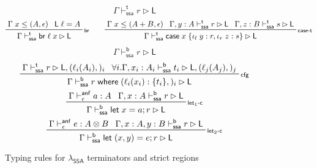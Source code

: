 \documentclass[acmsmall,screen,review]{acmart}
\newcommand{\ms}[1]{\ensuremath{\mathsf{#1}}}
\newcommand{\lto}{:}
\newcommand{\linl}[1]{\iota_l\;{#1}}
\newcommand{\linr}[1]{\iota_r\;{#1}}
\newcommand{\letstmt}[3]{\ensuremath{\ms{let}\;#1 = #2; #3}}
\newcommand{\brb}[2]{\ms{br}\;#1\;#2}
\newcommand{\casestmt}[5]{\ms{case}\;#1\;\{\linl{#2} \lto #3, \linr{#4} \lto #5\}}
\newcommand{\where}[2]{#1\;\ms{where}\;#2}
\newcommand{\wbranch}[3]{#1(#2) \lto \{#3\}}
\newcommand{\bhyp}[2]{#1 : #2}
\newcommand{\lhyp}[2]{#1(#2)}
\newcommand{\rle}[1]{{\scriptsize\textsf{#1}}}
\newcommand{\ahasty}[4]{#1 \vdash_{#2}^{\ms{anf}} #3 : {#4}}
\newcommand{\thaslb}[3]{#1 \vdash^{\ms{t}}_{\ms{ssa}} #2 \rhd #3}
\newcommand{\bhaslb}[3]{#1 \vdash^{\ms{b}}_{\ms{ssa}} #2 \rhd #3}
\newcommand{\isotopessa}{\(\lambda_{\ms{SSA}}\)}
\begin{document}
\begin{figure}
  \begin{equation*}
    \boxed{\thaslb{\Gamma}{r}{\ms{L}}}
  \end{equation*}
  \begin{gather*}
    \prftree[r]{\rle{br}}{\Gamma\;x \leq (A, \epsilon)}{\ms{L}\;\ell = A}
      {\thaslb{\Gamma}{\brb{\ell}{x}}{\ms{L}}} \qquad
    \prftree[r]{\rle{case-t}}
      {\Gamma\;x \leq (A + B, \epsilon)}
      {\thaslb{\Gamma, \bhyp{y}{A}}{r}{\ms{L}}}
      {\thaslb{\Gamma, \bhyp{z}{B}}{s}{\ms{L}}}
      {\thaslb{\Gamma}{\casestmt{x}{y}{r}{z}{s}}{\ms{L}}} \\
  \end{gather*}
  \begin{equation*}
    \boxed{\bhaslb{\Gamma}{r}{\ms{L}}}
  \end{equation*}
  \begin{gather*}
    \prftree[r]{\rle{cfg}}
      {\thaslb{\Gamma}{r}{\ms{L}, (\lhyp{\ell_i}{A_i},)_i}}
      {\forall i. \bhaslb{\Gamma, \bhyp{x_i}{A_i}}{t_i}{\ms{L}, (\lhyp{\ell_j}{A_j},)_j}}
      {\bhaslb{\Gamma}{\where{r}{(\wbranch{\ell_i}{x_i}{t_i},)_i}}{\ms{L}}} \\
    \prftree[r]{\rle{let$_1$-c}}
      {\ahasty{\Gamma}{\epsilon}{a}{A}}
      {\bhaslb{\Gamma, \bhyp{x}{A}}{r}{\ms{L}}}
      {\bhaslb{\Gamma}{\letstmt{x}{a}{r}}{\ms{L}}} \\
    \prftree[r]{\rle{let$_2$-c}}
      {\ahasty{\Gamma}{\epsilon}{e}{A \otimes B}}
      {\bhaslb{\Gamma, \bhyp{x}{A}, \bhyp{y}{B}}{r}{\ms{L}}}
      {\bhaslb{\Gamma}{\letstmt{(x, y)}{e}{r}}{\ms{L}}} \\
  \end{gather*}
  \caption{Typing rules for \isotopessa{} terminators and strict regions}
  \Description{}
  \label{fig:ssa-strict}
\end{figure}
\end{document}
